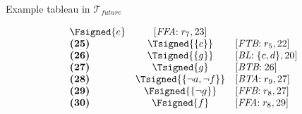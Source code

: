 \begin{frame}{Example tableau in $\mathcal{T}_{\textit{future}}$}
\begin{minipage}[t]{16cm}
\begin{minipage}[t]{6cm}
\[\begin{array}{lcl}
  \Fsigned{e}                                      &
  [\textit{FFA}{:}\;r_7, \text{23}]                \\
\textbf{(25)}                                      &
  \Tsigned{\{c\}}                                  &
  [\textit{FTB}{:}\;r_5, \text{22}]                \\
\textbf{(26)}                                      &
  \Tsigned{\{g\}}                                  &
  [\textit{BL}{:}\;\{c,d\}, \text{20}]             \\
\textbf{(27)}                                      &
  \Tsigned{g}                                      &
  [\textit{BTB}{:}\;\text{26}]                     \\
\textbf{(28)}                                      &
  \Tsigned{\{\neg a,\neg f\}}      &
  [\textit{BTA}{:}\;r_9, \text{27}]                \\
\textbf{(29)}                                      &
  \Fsigned{\{\neg g\}}                     &
  [\textit{FFB}{:}\;r_8, \text{27}]                \\
\textbf{(30)}                                      &
  \Fsigned{f}                                      &
  [\textit{FFA}{:}\;r_8, \text{29}]
\end{array}
\]
\end{minipage}
\end{minipage}
\end{frame}
%
